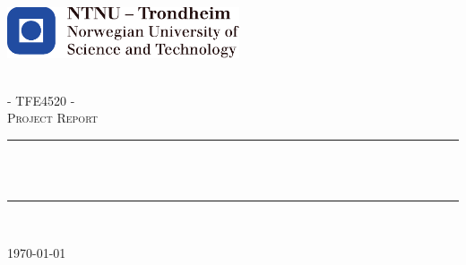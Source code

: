 \begin{titlepage}
\includegraphics[height=1.5cm]{images/ntnu_logo.pdf}\\[1cm]   
\begin{center}

 
~\\[1.5cm]

\textsc{\Large - TFE4520 - \\Project Report}\\[0.5cm]

\hrule ~\\[0.2cm]
{\huge \bfseries \mytitle}\\[0.4cm]		%
\hrule ~\\[1.5cm]

\begin{minipage}{0.4\textwidth}
    \centering
	\large
		\myauthor
\end{minipage}

\vfill

{\large \today}

\end{center}
\end{titlepage}
